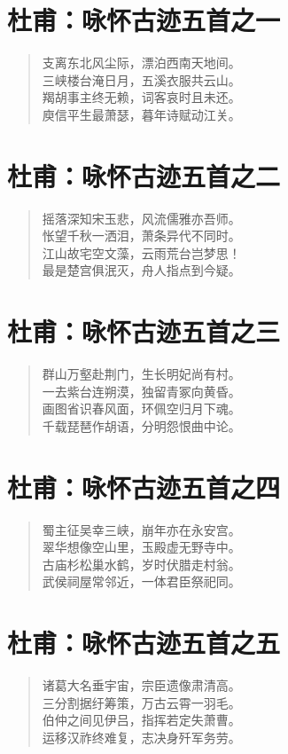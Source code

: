 \documentclass[12pt,oneside]{book}
\newenvironment{shici}{%
\begin{verse}\centering\yanti\large\hspace{12pt}}{\end{verse}}
\begin{document}
\begin{common-format}
\chapter{杜甫：咏怀古迹五首之一}
\begin{shici}
支离东北风尘际，漂泊西南天地间。\\
三峡楼台淹日月，五溪衣服共云山。\\
羯胡事主终无赖，词客哀时且未还。\\
庾信平生最萧瑟，暮年诗赋动江关。
\end{shici}

\chapter{杜甫：咏怀古迹五首之二}
\begin{shici}
摇落深知宋玉悲，风流儒雅亦吾师。\\
怅望千秋一洒泪，萧条异代不同时。\\
江山故宅空文藻，云雨荒台岂梦思！\\
最是楚宫俱泯灭，舟人指点到今疑。
\end{shici}

\chapter{杜甫：咏怀古迹五首之三}
\begin{shici}
群山万壑赴荆门，生长明妃尚有村。\\
一去紫台连朔漠，独留青冢向黄昏。\\
画图省识春风面，环佩空归月下魂。\\
千载琵琶作胡语，分明怨恨曲中论。
\end{shici}

\chapter{杜甫：咏怀古迹五首之四}
\begin{shici}
蜀主征吴幸三峡，崩年亦在永安宫。\\
翠华想像空山里，玉殿虚无野寺中。\\
古庙杉松巢水鹤，岁时伏腊走村翁。\\
武侯祠屋常邻近，一体君臣祭祀同。
\end{shici}

\chapter{杜甫：咏怀古迹五首之五}
\begin{shici}
诸葛大名垂宇宙，宗臣遗像肃清高。\\
三分割据纡筹策，万古云霄一羽毛。\\
伯仲之间见伊吕，指挥若定失萧曹。\\
运移汉祚终难复，志决身歼军务劳。
\end{shici}


\end{common-format}
\end{document}
